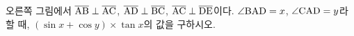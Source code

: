 \noindent\begin{minipage}[t]{0.58\linewidth}\vspace{0pt}\raggedright 오른쪽 그림에서 $\overline{\mathrm{AB}}\perp\overline{\mathrm{AC}}$, $\overline{\mathrm{AD}}\perp\overline{\mathrm{BC}}$, $\overline{\mathrm{AC}}\perp\overline{\mathrm{DE}}$이다. $\angle\mathrm{BAD}=x$, $\angle\mathrm{CAD}=y$라 할 때, $(\sin x+\cos y)\times\tan x$의 값을 구하시오.\end{minipage}\hfill\begin{minipage}[t]{0.4\linewidth}\vspace{0pt}\centering \resizebox{\ifdim\width>\linewidth\linewidth\else\width\fi}{!}{}\end{minipage}\par
